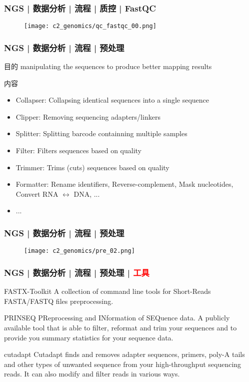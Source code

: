 \begin{frame}
  \frametitle{NGS | 数据分析 | 流程 | 质控 | FastQC}
  \begin{figure}
    \centering
    \texttt{[image: c2\_genomics/qc\_fastqc\_00.png]}
  \end{figure}
\end{frame}

\begin{frame}
  \frametitle{NGS | 数据分析 | 流程 | 预处理}
  \begin{block}{目的}
 manipulating the sequences to produce better mapping results
  \end{block}
  \pause
  \begin{block}{内容}
    \begin{itemize}
      \item Collapser: Collapsing identical sequences into a single sequence
      \item Clipper: Removing sequencing adapters/linkers
      \item Splitter: Splitting barcode containning multiple samples
      \item Filter: Filters sequences based on quality
      \item Trimmer: Trims (cuts) sequences based on quality
      \item Formatter: Rename identifiers, Reverse-complement, Mask nucleotides, Convert RNA $\leftrightarrow$ DNA, ...
      \item ...
    \end{itemize}
  \end{block}
\end{frame}

\begin{frame}
  \frametitle{NGS | 数据分析 | 流程 | 预处理}
  \begin{figure}
    \centering
    \texttt{[image: c2\_genomics/pre\_02.png]}
  \end{figure}
\end{frame}

\begin{frame}
  \frametitle{NGS | 数据分析 | 流程 | 预处理 | \textcolor{red}{工具}}
  \begin{block}{FASTX-Toolkit}
    A collection of command line tools for Short-Reads FASTA/FASTQ files preprocessing.
  \end{block}
  \pause
  \begin{block}{PRINSEQ}
    PReprocessing and INformation of SEQuence data. A publicly available tool that is able to filter, reformat and trim your sequences and to provide you summary statistics for your sequence data.
  \end{block}
  \pause
  \begin{block}{cutadapt}
    Cutadapt finds and removes adapter sequences, primers, poly-A tails and other types of unwanted sequence from your high-throughput sequencing reads. It can also modify and filter reads in various ways.
  \end{block}
\end{frame}

